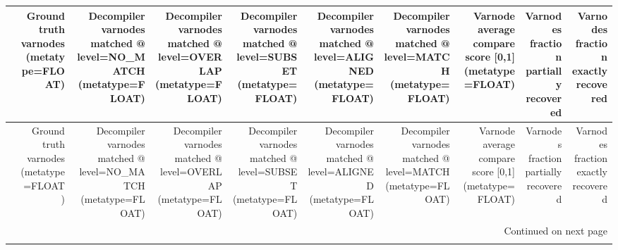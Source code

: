 \begin{longtable}{lrrrrrrrrr}
\toprule
{} &  Ground truth varnodes (metatype=FLOAT) &  Decompiler varnodes matched @ level=NO\_MATCH (metatype=FLOAT) &  Decompiler varnodes matched @ level=OVERLAP (metatype=FLOAT) &  Decompiler varnodes matched @ level=SUBSET (metatype=FLOAT) &  Decompiler varnodes matched @ level=ALIGNED (metatype=FLOAT) &  Decompiler varnodes matched @ level=MATCH (metatype=FLOAT) &  Varnode average compare score {[}0,1] (metatype=FLOAT) &  Varnodes fraction partially recovered &  Varnodes fraction exactly recovered \\
\midrule
\endfirsthead

\toprule
{} &  Ground truth varnodes (metatype=FLOAT) &  Decompiler varnodes matched @ level=NO\_MATCH (metatype=FLOAT) &  Decompiler varnodes matched @ level=OVERLAP (metatype=FLOAT) &  Decompiler varnodes matched @ level=SUBSET (metatype=FLOAT) &  Decompiler varnodes matched @ level=ALIGNED (metatype=FLOAT) &  Decompiler varnodes matched @ level=MATCH (metatype=FLOAT) &  Varnode average compare score {[}0,1] (metatype=FLOAT) &  Varnodes fraction partially recovered &  Varnodes fraction exactly recovered \\
\midrule
\endhead
\midrule
\multicolumn{10}{r}{{Continued on next page}} \\
\midrule
\endfoot


\end{longtable}
